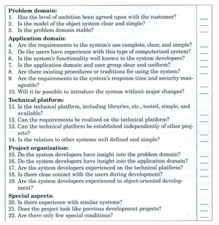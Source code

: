 \begin{figure}[H]
    \centering
    \includegraphics[width=\linewidth]{parts/6_practice/1_strategy/figures/checklist.png}
\end{figure}